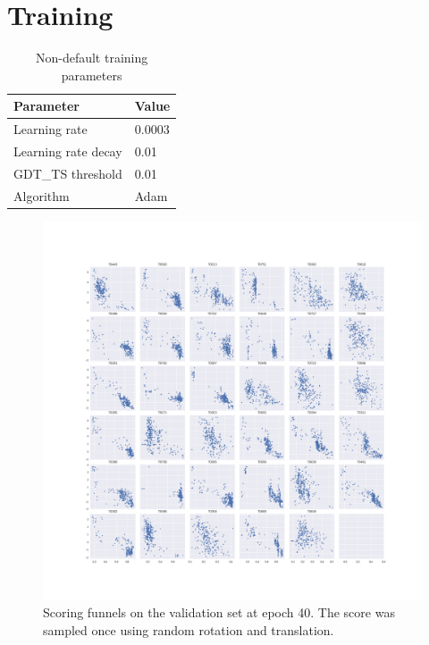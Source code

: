 \documentclass[letter,10pt]{article}
\begin{document}
\section{Training}
\begin{table}[H]
\begin{center}
\begin{tabular}{ l | l }

    Parameter & Value \\
    \hline
    Learning rate& 0.0003\\
    Learning rate decay& 0.01\\
    GDT\_TS threshold& 0.01\\
    Algorithm& Adam
    
\end{tabular}
\caption{Non-default training parameters}
%
\label{Tbl:TrainingParam}
\end{center}
\end{table}

\begin{figure}[H]
    \centering
    \includegraphics[width=\linewidth]{Fig/epoch40_funnels.png}
    \caption{Scoring funnels on the validation set at epoch 40. The score was sampled once using random rotation and translation.}
    \label{Fig:ValidationEpoch40}
\end{figure}
\end{document}
